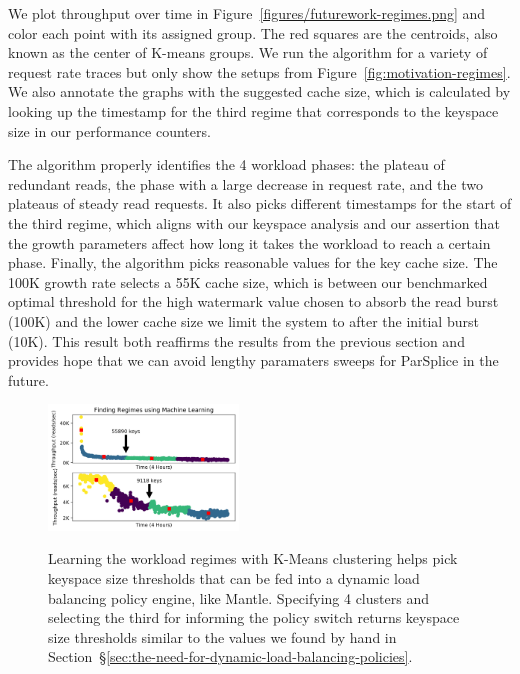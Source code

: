 We plot throughput over time in Figure~\ref{figures/futurework-regimes.png} and
color each point with its assigned group. The red squares are the centroids,
also known as the center of K-means groups.  We run the algorithm for a variety
of request rate traces but only show the setups from
Figure~\ref{fig:motivation-regimes}. We also annotate the graphs with the
suggested cache size, which is calculated by looking up the timestamp for the
third regime that corresponds to the keyspace size in our performance counters.

The algorithm properly identifies the 4 workload phases: the plateau of
redundant reads, the phase with a large decrease in request rate, and the two
plateaus of steady read requests. It also picks different timestamps for the
start of the third regime, which aligns with our keyspace analysis and our
assertion that the growth parameters affect how long it takes the workload to
reach a certain phase.  Finally, the algorithm picks reasonable values for the
key cache size. The 100K growth rate selects a 55K cache size, which is between
our benchmarked optimal threshold for the high watermark value chosen to
absorb the read burst (100K) and the lower cache size we limit the system to
after the initial burst (10K). This result both reaffirms the results from the
previous section and provides hope that we can avoid lengthy paramaters sweeps
for ParSplice in the future.

\begin{figure}[tbh]
\noindent\includegraphics[width=0.45\textwidth]{figures/futurework-regimes.png}\\
  \caption{Learning the workload regimes with K-Means clustering helps pick
  keyspace size thresholds that can be fed into a dynamic load balancing policy
  engine, like Mantle. Specifying 4 clusters and selecting the third for
  informing the policy switch returns keyspace size thresholds similar to the
  values we found by hand in
  Section~\S\ref{sec:the-need-for-dynamic-load-balancing-policies}.
\label{fig:futurework-regimes}}
\end{figure}
